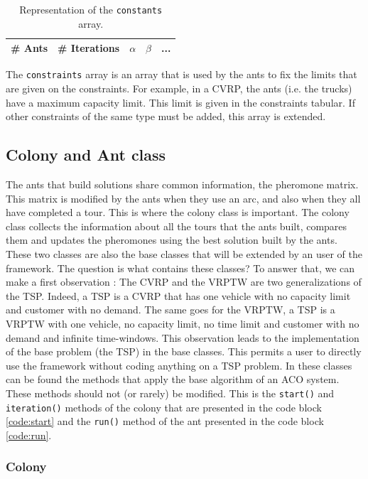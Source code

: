 	\begin{table}%
	\centering
	\begin{tabular}{|c|c|c|c|c|}
	\hline
	\# Ants & \# Iterations & $\alpha$ & $\beta$ & ...\\
	\hline
	\end{tabular}
	\caption{Representation of the \texttt{constants} array.}
	\label{tab:constants}
	\end{table}
	
	The \texttt{constraints} array is an array that is used by the ants to fix the limits that are given on the constraints. For example, in a CVRP, the ants (i.e. the trucks) have a maximum capacity limit. This limit is given in the constraints tabular. If other constraints of the same type must be added, this array is extended.
	
\subsection{Colony and Ant class}
	The ants that build solutions share common information, the pheromone matrix. This matrix is modified by the ants when they use an arc, and also when they all have completed a tour. This is where the colony class is important. The colony class collects the information about all the tours that the ants built, compares them and updates the pheromones using the best solution built by the ants.
	These two classes are also the base classes that will be extended by an user of the framework. The question is what contains these classes? 
	To answer that, we can make a first observation : The CVRP and the VRPTW are two generalizations of the TSP. Indeed, a TSP is a CVRP that has one vehicle with no capacity limit and customer with no demand. The same goes for the VRPTW, a TSP is a VRPTW with one vehicle, no capacity limit, no time limit and customer with no demand and infinite time-windows. 
	This observation leads to the implementation of the base problem (the TSP) in the base classes. This permits a user to directly use the framework without coding anything on a TSP problem. 
	In these classes can be found the methods that apply the base algorithm of an ACO system. These methods should not (or rarely) be modified. This is the \texttt{start()} and \texttt{iteration()} methods of the colony that are presented in the code block \ref{code:start} and the \texttt{run()} method of the ant presented in the code block \ref{code:run}. 
	
	\subsubsection{Colony}
	
